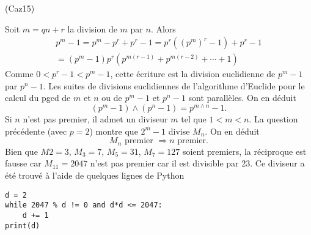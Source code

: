 \begin{tiny}(Caz15)\end{tiny} Soit $m = qn +r$ la division de $m$ par $n$. Alors
\begin{multline*}
p^m - 1 = p^m - p^r + p^r -1
= p^r\left( (p^m)^r - 1 \right) + p^r - 1 \\
= (p^m-1)p^r\left( p^{m(r-1)} + p^{m(r-2)} + \cdots + 1\right) 
\end{multline*}
Comme $0 < p^r - 1 < p^m -1$, cette écriture est la division euclidienne de $p^m -1$ par $p^n -1$. Les suites de divisions euclidiennes de l'algorithme d'Euclide pour le calcul du pgcd de $m$ et $n$ ou de $p^m-1$ et $p^n-1$ sont parallèles. On en déduit
\[
 (p^m - 1)\wedge (p^n - 1) = p^{m \wedge n} - 1.
\]
Si $n$ n'est pas premier, il admet un diviseur $m$ tel que $1 < m < n$. La question précédente (avec $p=2$) montre que $2^m - 1$ divise $M_n$. On en déduit 
\[
 M_n \text{ premier } \Rightarrow n \text{ premier}.
\]
Bien que $M2 =3$, $M_3 = 7$, $M_5 = 31$, $M_7 = 127$ soient premiers, la réciproque est fausse car $M_{11} = 2047$ n'est pas premier car il est divisible par $23$. Ce diviseur a été trouvé à l'aide de quelques lignes de Python
\begin{verbatim}
d = 2
while 2047 % d != 0 and d*d <= 2047:
    d += 1
print(d)
\end{verbatim} 
